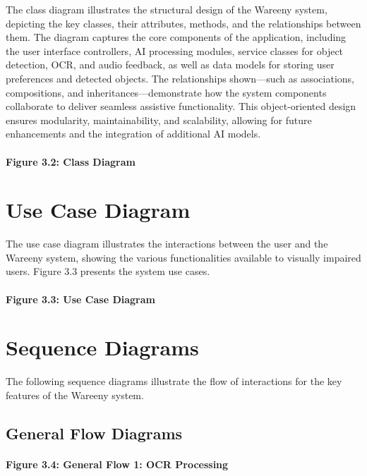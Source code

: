 \documentclass[12pt,a4paper]{report}
\begin{document}
The class diagram illustrates the structural design of the Wareeny system, depicting the key classes, their attributes, methods, and the relationships between them. The diagram captures the core components of the application, including the user interface controllers, AI processing modules, service classes for object detection, OCR, and audio feedback, as well as data models for storing user preferences and detected objects. The relationships shown---such as associations, compositions, and inheritances---demonstrate how the system components collaborate to deliver seamless assistive functionality. This object-oriented design ensures modularity, maintainability, and scalability, allowing for future enhancements and the integration of additional AI models.

\paragraph*{Figure 3.2: Class Diagram}

\section{Use Case Diagram}

The use case diagram illustrates the interactions between the user and the Wareeny system, showing the various functionalities available to visually impaired users. Figure 3.3 presents the system use cases.

\paragraph*{Figure 3.3: Use Case Diagram}

\section{Sequence Diagrams}

The following sequence diagrams illustrate the flow of interactions for the key features of the Wareeny system.

\subsection{General Flow Diagrams}

\paragraph*{Figure 3.4: General Flow 1: OCR Processing}
\end{document}
